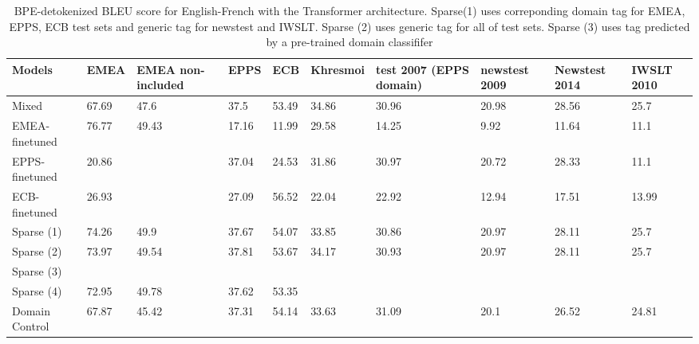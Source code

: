 \documentclass[11pt,a4paper]{article}
\begin{document}
\begin{table}
\begin{center}
 \begin{tabularx}{\textwidth}{|| X | X | X | X | X | X | X | X | X | X ||} 
 \hline
 Models & EMEA & EMEA non-included & EPPS & ECB & Khresmoi & test 2007 (EPPS domain) & newstest 2009 & Newstest 2014 & IWSLT 2010 \\ [0.5ex] 
 \hline\hline
 Mixed & 67.69 & 47.6 & 37.5 & 53.49 & 34.86 & 30.96 & 20.98 & 28.56 & 25.7 \\
 \hline
 EMEA-finetuned & 76.77 & 49.43 & 17.16 & 11.99 & 29.58 & 14.25 & 9.92 & 11.64 & 11.1 \\
 \hline
 EPPS-finetuned & 20.86 & & 37.04 & 24.53 & 31.86 & 30.97 & 20.72 & 28.33 & 11.1 \\
 \hline
 ECB-finetuned & 26.93 & & 27.09 & 56.52 & 22.04 & 22.92 & 12.94 & 17.51 & 13.99 \\
 \hline
 Sparse (1) & 74.26 & 49.9 & 37.67 & 54.07 & 33.85 & 30.86 & 20.97 & 28.11 & 25.7 \\
 \hline
 Sparse (2) & 73.97 & 49.54 & 37.81 & 53.67 & 34.17 & 30.93 & 20.97 & 28.11 & 25.7 \\
 \hline
 Sparse (3) &  &  &  & &  &  &  &  & \\
 \hline
 Sparse (4) & 72.95 & 49.78 & 37.62 & 53.35 &  &  &  &  & \\
 \hline
 Domain Control & 67.87 & 45.42 & 37.31 & 54.14 & 33.63 & 31.09 &  20.1 & 26.52 & 24.81\\
 \hline
\end{tabularx}
\end{center}

\caption{BPE-detokenized BLEU score for English-French with the Transformer architecture. Sparse(1) uses correponding domain tag for EMEA, EPPS, ECB test sets and generic tag for newstest and IWSLT. Sparse (2) uses generic tag for all of test sets. Sparse (3) uses tag predicted by a pre-trained domain classififer}
\label{tab:1}
\end{table}
\end{document}
